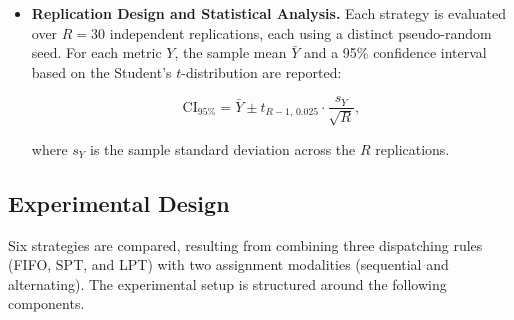 \documentclass[sn-mathphys-num]{sn-jnl}
\begin{document}
\begin{itemize}
  where $t_0$ is the horizon start and $t_i^{\text{end}}$ is the
  completion time of surgery $i$. Lead time as defined here measures
  the average temporal position at which surgeries are completed within
  the horizon, not the individual waiting time from queue entry; a
  lower lead time indicates production concentrated in earlier phases
  of the horizon.

  \item \textbf{Replication Design and Statistical Analysis.}
  Each strategy is evaluated over $R = 30$ independent replications,
  each using a distinct pseudo-random seed. For each metric $Y$, the
  sample mean $\bar{Y}$ and a 95\% confidence interval based on the
  Student's $t$-distribution are reported:

  \begin{equation}
  \text{CI}_{95\%} = \bar{Y} \pm t_{R-1,\, 0.025} \cdot
  \frac{s_Y}{\sqrt{R}},
  \end{equation}

  where $s_Y$ is the sample standard deviation across the $R$
  replications.

\end{itemize}

\subsection{Experimental Design}

Six strategies are compared, resulting from combining three dispatching
rules (FIFO, SPT, and LPT) with two assignment modalities (sequential
and alternating). The experimental setup is structured around the
following components.
\end{document}

